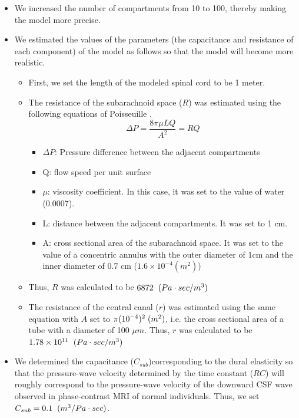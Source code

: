 \documentclass[fleqn,10pt]{wlscirep}
\begin{document}
\begin{itemize}
    \item We increased the number of compartments from 10 to 100,
        thereby making the model more precise.
    \item We estimated the values of the parameters
        (the capacitance and resistance of each component)
        of the model as follows so that the model will become more realistic.
        \begin{itemize}
            \item First, we set the length of the modeled spinal cord to be 1 meter.
            \item The resistance of the subarachnoid space ($R$) was
                estimated using the following equations of Poisseuille
                \cite{brook1999numerical, sherwin2003computational, huilgol2020fast}. 
             $$\Delta P=\frac{8\pi \mu{}LQ}{A^{2}}=RQ$$
                \begin{itemize}
                    \item $\Delta P$: Pressure difference between the adjacent compartments
                    \item Q: flow speed per unit surface
                    \item $\mu$: viscosity coefficient. In this case, it was set to the value of water (0.0007).
                    \item L: distance between the adjacent compartments. It was set to 1 cm.
                    \item A: cross sectional area of the subarachnoid
                        space. It was set to the value of a concentric
                        annulus \cite{huilgol2020fast} with the outer diameter of 1cm and the inner diameter of 0.7 cm ($1.6\times{}10^{-4} (m^2)$) 
                \end{itemize}
            \item Thus, $R$ was calculated to be $6872\hspace{0.2cm}(Pa\cdot{}sec/m^3)$
            \item The resistance of the central canal ($r$) was estimated
                using the same equation with $A$ set to
                $\pi{}(10^{-4})^2\hspace{0.1cm}(m^2)$, i.e. the cross
                sectional area of a tube with a diameter of 100 $\mu{}m$.
                Thus, $r$ was calculated to be $1.78\times10^{11}\hspace{0.2cm}(Pa\cdot{}sec/m^3)$
        \end{itemize}
    \item We determined the capacitance ($C_{sub}$)corresponding to the dural elasticity so that the pressure-wave velocity determined by the time constant ($RC$) will roughly correspond to the pressure-wave velocity of the downward CSF wave observed in phase-contrast MRI of normal individuals. Thus, we set $C_{sub}=0.1\hspace{0.2cm}(m^3/Pa\cdot{}sec)$.
\end{itemize}
\end{document}
